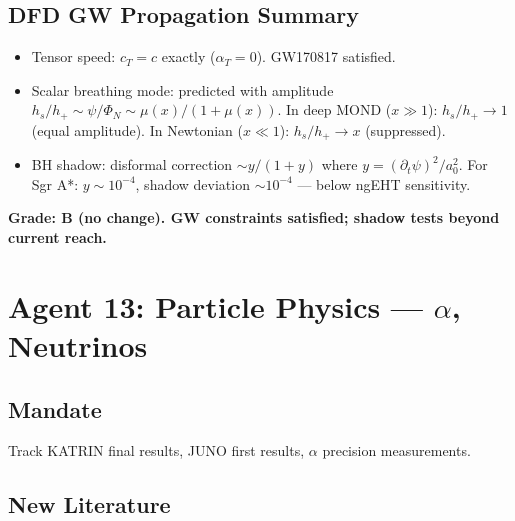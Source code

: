 \documentclass[11pt,a4paper]{article}
\begin{document}
\subsection{DFD GW Propagation Summary}
\begin{itemize}
\item Tensor speed: $c_T = c$ exactly ($\alpha_T = 0$). GW170817 satisfied.
\item Scalar breathing mode: predicted with amplitude $h_s/h_+ \sim \psi/\Phi_N \sim \mu(x)/(1+\mu(x))$. In deep MOND ($x \gg 1$): $h_s/h_+ \to 1$ (equal amplitude). In Newtonian ($x \ll 1$): $h_s/h_+ \to x$ (suppressed).
\item BH shadow: disformal correction $\sim y/(1+y)$ where $y = (\partial_t\psi)^2/a_0^2$. For Sgr A*: $y \sim 10^{-4}$, shadow deviation $\sim 10^{-4}$ --- below ngEHT sensitivity.
\end{itemize}

\textbf{Grade: B (no change). GW constraints satisfied; shadow tests beyond current reach.}

\section{Agent 13: Particle Physics --- $\alpha$, Neutrinos}

\subsection{Mandate}
Track KATRIN final results, JUNO first results, $\alpha$ precision measurements.

\subsection{New Literature}
\end{document}
